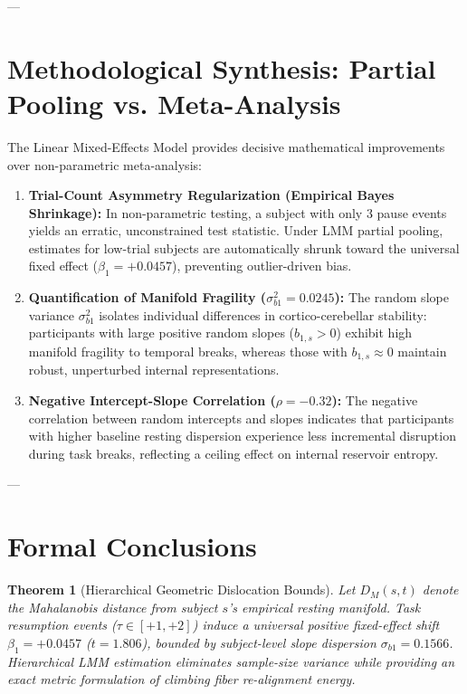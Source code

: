 \documentclass[11pt,twoside,a4paper]{article}
\newtheorem{theorem}{Theorem}
\begin{document}
---

\section{Methodological Synthesis: Partial Pooling vs. Meta-Analysis}

The Linear Mixed-Effects Model provides decisive mathematical improvements over non-parametric meta-analysis:

\begin{enumerate}
    \item \textbf{Trial-Count Asymmetry Regularization (Empirical Bayes Shrinkage):}
    In non-parametric testing, a subject with only 3 pause events yields an erratic, unconstrained test statistic. Under LMM partial pooling, estimates for low-trial subjects are automatically shrunk toward the universal fixed effect ($\beta_1 = +0.0457$), preventing outlier-driven bias.
    
    \item \textbf{Quantification of Manifold Fragility ($\sigma_{b1}^2 = 0.0245$):}
    The random slope variance $\sigma_{b1}^2$ isolates individual differences in cortico-cerebellar stability: participants with large positive random slopes ($b_{1,s} > 0$) exhibit high manifold fragility to temporal breaks, whereas those with $b_{1,s} \approx 0$ maintain robust, unperturbed internal representations.
    
    \item \textbf{Negative Intercept-Slope Correlation ($\rho = -0.32$):}
    The negative correlation between random intercepts and slopes indicates that participants with higher baseline resting dispersion experience less incremental disruption during task breaks, reflecting a ceiling effect on internal reservoir entropy.
\end{enumerate}

---

\section{Formal Conclusions}

\begin{theorem}[Hierarchical Geometric Dislocation Bounds]
Let $D_M(s, t)$ denote the Mahalanobis distance from subject $s$'s empirical resting manifold. Task resumption events ($\tau \in [+1, +2]$) induce a universal positive fixed-effect shift $\beta_1 = +0.0457$ ($t = 1.806$), bounded by subject-level slope dispersion $\sigma_{b1} = 0.1566$. Hierarchical LMM estimation eliminates sample-size variance while providing an exact metric formulation of climbing fiber re-alignment energy.
\end{theorem}
\end{document}
